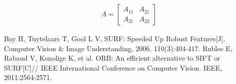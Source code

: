 \documentclass[paper=a4, fontsize=11pt]{scrartcl} %
\numberwithin{equation}{section} %
\numberwithin{figure}{section} %
\numberwithin{table}{section} %
\begin{document}
\begin{align}
A = 
\begin{bmatrix}
A_{11} & A_{21} \\
A_{21} & A_{22}
\end{bmatrix}
\end{align}



\renewcommand\refname{Reference}

\begin{thebibliography}{99}
Bay H, Tuytelaars T, Gool L V. SURF: Speeded Up Robust Features[J]. Computer Vision \& Image Understanding, 2006, 110(3):404-417.
Rublee E, Rabaud V, Konolige K, et al. ORB: An efficient alternative to SIFT or SURF[C]// IEEE International Conference on Computer Vision. IEEE, 2011:2564-2571.
\end{thebibliography}
\end{document}
